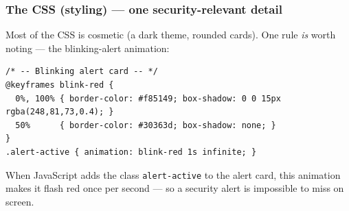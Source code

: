 \documentclass[11pt,a4paper]{report}
\begin{document}
\subsubsection*{The CSS (styling) --- one security-relevant detail}
Most of the CSS is cosmetic (a dark theme, rounded cards). One rule \emph{is}
worth noting --- the blinking-alert animation:
\begin{lstlisting}[style=web,caption={dashboard.html --- the alert-blink CSS (decorative comment dashes simplified).}]
/* -- Blinking alert card -- */
@keyframes blink-red {
  0%, 100% { border-color: #f85149; box-shadow: 0 0 15px rgba(248,81,73,0.4); }
  50%      { border-color: #30363d; box-shadow: none; }
}
.alert-active { animation: blink-red 1s infinite; }
\end{lstlisting}
When JavaScript adds the class \texttt{alert-active} to the alert card, this
animation makes it flash red once per second --- so a security alert is
impossible to miss on screen.
\end{document}
